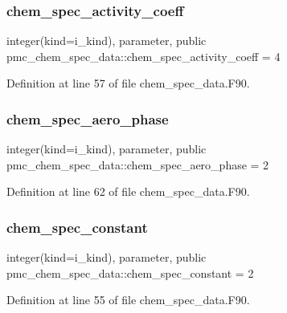 \subsubsection{\texorpdfstring{chem\+\_\+spec\+\_\+activity\+\_\+coeff}{chem\_spec\_activity\_coeff}}
{\footnotesize\ttfamily integer(kind=i\+\_\+kind), parameter, public pmc\+\_\+chem\+\_\+spec\+\_\+data\+::chem\+\_\+spec\+\_\+activity\+\_\+coeff = 4}



Definition at line 57 of file chem\+\_\+spec\+\_\+data.\+F90.

\mbox{\label{namespacepmc__chem__spec__data_a1076e0bc8b754d3cf8e43333e92afc81}} 
\subsubsection{\texorpdfstring{chem\+\_\+spec\+\_\+aero\+\_\+phase}{chem\_spec\_aero\_phase}}
{\footnotesize\ttfamily integer(kind=i\+\_\+kind), parameter, public pmc\+\_\+chem\+\_\+spec\+\_\+data\+::chem\+\_\+spec\+\_\+aero\+\_\+phase = 2}



Definition at line 62 of file chem\+\_\+spec\+\_\+data.\+F90.

\mbox{\label{namespacepmc__chem__spec__data_a0bf400fe217f79a52fcf4d1cc19f1ddc}} 
\subsubsection{\texorpdfstring{chem\+\_\+spec\+\_\+constant}{chem\_spec\_constant}}
{\footnotesize\ttfamily integer(kind=i\+\_\+kind), parameter, public pmc\+\_\+chem\+\_\+spec\+\_\+data\+::chem\+\_\+spec\+\_\+constant = 2}



Definition at line 55 of file chem\+\_\+spec\+\_\+data.\+F90.

